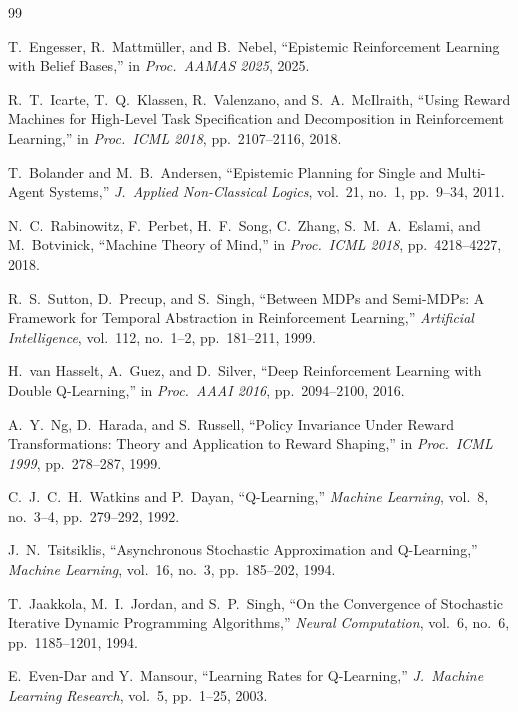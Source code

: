\documentclass[letterpaper, 10 pt, conference]{ieeeconf}  %
\begin{document}
\begin{thebibliography}{99}

T.~Engesser, R.~Mattm\"{u}ller, and B.~Nebel,
``Epistemic Reinforcement Learning with Belief Bases,''
in {\it Proc.\ AAMAS 2025}, 2025.

R.~T.~Icarte, T.~Q.~Klassen, R.~Valenzano, and S.~A.~McIlraith,
``Using Reward Machines for High-Level Task Specification and Decomposition in Reinforcement Learning,''
in {\it Proc.\ ICML 2018}, pp.~2107--2116, 2018.

T.~Bolander and M.~B.~Andersen,
``Epistemic Planning for Single and Multi-Agent Systems,''
{\it J.\ Applied Non-Classical Logics}, vol.~21, no.~1, pp.~9--34, 2011.

N.~C.~Rabinowitz, F.~Perbet, H.~F.~Song, C.~Zhang, S.~M.~A.~Eslami, and M.~Botvinick,
``Machine Theory of Mind,''
in {\it Proc.\ ICML 2018}, pp.~4218--4227, 2018.

R.~S.~Sutton, D.~Precup, and S.~Singh,
``Between MDPs and Semi-MDPs: A Framework for Temporal Abstraction in Reinforcement Learning,''
{\it Artificial Intelligence}, vol.~112, no.~1--2, pp.~181--211, 1999.

H.~van Hasselt, A.~Guez, and D.~Silver,
``Deep Reinforcement Learning with Double Q-Learning,''
in {\it Proc.\ AAAI 2016}, pp.~2094--2100, 2016.

A.~Y.~Ng, D.~Harada, and S.~Russell,
``Policy Invariance Under Reward Transformations: Theory and Application to Reward Shaping,''
in {\it Proc.\ ICML 1999}, pp.~278--287, 1999.

C.~J.~C.~H.~Watkins and P.~Dayan,
``Q-Learning,''
{\it Machine Learning}, vol.~8, no.~3--4, pp.~279--292, 1992.

J.~N.~Tsitsiklis,
``Asynchronous Stochastic Approximation and Q-Learning,''
{\it Machine Learning}, vol.~16, no.~3, pp.~185--202, 1994.

T.~Jaakkola, M.~I.~Jordan, and S.~P.~Singh,
``On the Convergence of Stochastic Iterative Dynamic Programming Algorithms,''
{\it Neural Computation}, vol.~6, no.~6, pp.~1185--1201, 1994.

E.~Even-Dar and Y.~Mansour,
``Learning Rates for Q-Learning,''
{\it J.\ Machine Learning Research}, vol.~5, pp.~1--25, 2003.

\end{thebibliography}
\end{document}
